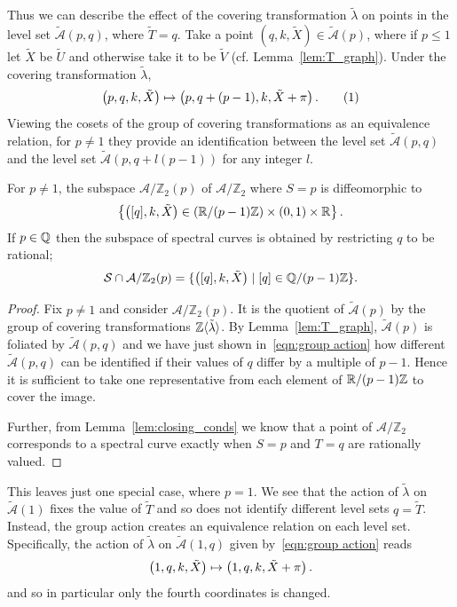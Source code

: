 \documentclass{article}
\begin{document}
Thus we can describe the effect of the covering transformation $\tilde{\lambda}$ on points in the level set $\mathcal{\tilde{A}}(p,q)$, where $\tilde{T} = q$. Take a point $(q,k,\tilde{X}) \in \mathcal{\tilde{A}}(p)$, where if $p\leq 1$ let $\tilde{X}$ be $\tilde{U}$ and otherwise take it to be $\tilde{V}$ (cf. Lemma~\ref{lem:T_graph}). Under the covering transformation $\tilde{\lambda}$,
\[
\bra{p,q,k,\tilde{X}} \mapsto \bra{p, q + (p-1), k, \tilde{X} + \pi}.
\labelthis{eqn:group action}
\]
Viewing the cosets of the group of covering transformations as an equivalence relation, for $p\neq 1$ they provide an identification between the level set $\mathcal{\tilde{A}}(p,q)$ and the level set $\mathcal{\tilde{A}}(p,q + l(p-1))$ for any integer $l$.

\begin{thm}\label{thm:topology_curves}
For $p\neq 1$, the subspace $\mathcal{A}/\mathbb{Z}_2(p)$ of $\mathcal{A}/\mathbb{Z}_2$ where $S=p$ is diffeomorphic to
\[
\left\{ \left([q],k,\tilde{X}\right) \in \left(\mathbb{R}/ (p-1)\mathbb{Z}\right) \times (0,1) \times \mathbb{R} \right\}.
\]
If $p\in\mathbb{Q}$ then the subspace of spectral curves is obtained by restricting $q$ to be rational;
\[
\mathcal{S} \cap \mathcal{A}/\mathbb{Z}_2(p)  = \{ \left([q],k,\tilde{X}\right) \mid [q] \in \mathbb{Q}/ (p-1)\mathbb{Z} \}.
\]
\begin{proof}
Fix $p\neq 1$ and consider $\mathcal{A}/\mathbb{Z}_2(p)$. It is the quotient of $\mathcal{\tilde{A}}(p)$ by the group of covering transformations $\mathbb{Z}\langle\tilde{\lambda}\rangle$. By Lemma~\ref{lem:T_graph}, $\mathcal{\tilde{A}}(p)$ is foliated by $\mathcal{\tilde{A}}(p,q)$ and we have just shown in~\eqref{eqn:group action} how different $\mathcal{\tilde{A}}(p,q)$ can be identified if their values of $q$ differ by a multiple of $p-1$. Hence it is sufficient to take one representative from each element of $\mathbb{R}/(p-1)\mathbb{Z}$ to cover the image.

Further, from Lemma~\ref{lem:closing_conds} we know that a point of $\mathcal{A}/\mathbb{Z}_2$ corresponds to a spectral curve exactly when $S=p$ and $T=q$ are rationally valued.
\end{proof}
\end{thm}

This leaves just one special case, where $p=1$. We see that the action of $\tilde{\lambda}$ on $\mathcal{\tilde{A}}(1)$ fixes the value of $\tilde{T}$ and so does not identify different level sets $q=\tilde{T}$. Instead, the group action creates an equivalence relation on each level set. Specifically, the action of $\tilde{\lambda}$ on $\mathcal{\tilde{A}}(1,q)$ given by~\eqref{eqn:group action} reads
\[
\left(1,q,k,\tilde{X}\right) \mapsto \left(1, q, k, \tilde{X} + \pi\right).
\]
and so in particular only the fourth coordinates is changed.
\end{document}
